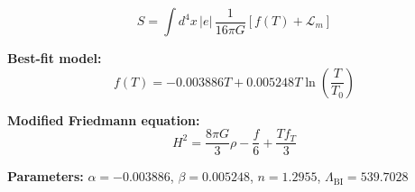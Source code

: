 
\begin{equation}
  S = \int d^4x \, |e| \, \frac{1}{16\pi G} \left[ f(T) + \mathcal{L}_m \right]
\end{equation}

\textbf{Best-fit model:}
\begin{equation}
  f(T) = -0.003886 T + 0.005248 T \ln\!\left(\frac{T}{T_0}\right)
\end{equation}

\textbf{Modified Friedmann equation:}
\begin{equation}
  H^2 = \frac{8\pi G}{3} \rho - \frac{f}{6} + \frac{T f_T}{3}
\end{equation}

\textbf{Parameters:}
$\alpha = -0.003886$, \quad
$\beta = 0.005248$, \quad
$n = 1.2955$, \quad
$\Lambda_{\text{BI}} = 539.7028$
